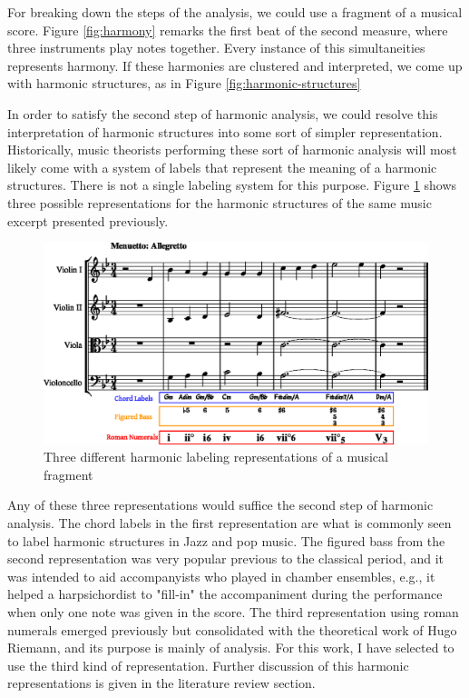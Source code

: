 For breaking down the steps of the analysis, we could use a fragment of a musical score. Figure \ref{fig:harmony} remarks the first beat of the second measure, where three instruments play notes together. Every instance of this simultaneities represents harmony. If these harmonies are clustered and interpreted, we come up with harmonic structures, as in Figure \ref{fig:harmonic-structures}

In order to satisfy the second step of harmonic analysis, we could resolve this interpretation of harmonic structures into some sort of simpler representation. Historically, music theorists performing these sort of harmonic analysis will most likely come with a system of labels that represent the meaning of a harmonic structures. There is not a single labeling system for this purpose. Figure \ref{fig:harmonic-labels} shows three possible representations for the harmonic structures of the same music excerpt presented previously.

\begin{figure}[h]
  \caption{Three different harmonic labeling representations of a musical fragment}
  \label{fig:harmonic-labels}
  \centering
    \includegraphics[width=1.0\textwidth]{01-introduction/figures/3}
\end{figure}

Any of these three representations would suffice the second step of harmonic analysis. The chord labels in the first representation are what is commonly seen to label harmonic structures in Jazz and pop music. The figured bass from the second representation was very popular previous to the classical period, and it was intended to aid accompanyists who played in chamber ensembles, e.g., it helped a harpsichordist to "fill-in" the accompaniment during the performance when only one note was given in the score. The third representation using roman numerals emerged previously but consolidated with the theoretical work of Hugo Riemann, and its purpose is mainly of analysis. For this work, I have selected to use the third kind of representation. Further discussion of this harmonic representations is given in the literature review section.

